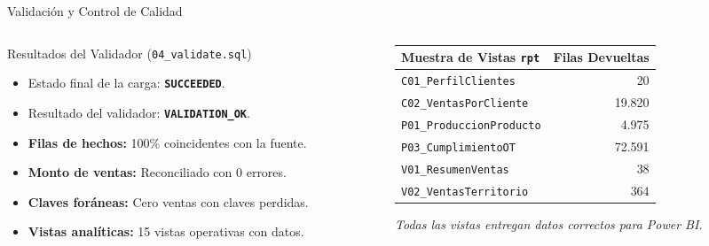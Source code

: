 \documentclass[aspectratio=169, 10pt]{beamer}
\begin{document}
\begin{frame}{Validación y Control de Calidad}
    \begin{columns}[c]
        \begin{column}{0.52\textwidth}
            \begin{block}{Resultados del Validador (\texttt{04\_validate.sql})}
                \small
                \begin{itemize}
                    \item Estado final de la carga: \textbf{\texttt{SUCCEEDED}}.
                    \item Resultado del validador: \textbf{\texttt{VALIDATION\_OK}}.
                    \item \textbf{Filas de hechos:} 100\% coincidentes con la fuente.
                    \item \textbf{Monto de ventas:} Reconciliado con 0 errores.
                    \item \textbf{Claves foráneas:} Cero ventas con claves perdidas.
                    \item \textbf{Vistas analíticas:} 15 vistas operativas con datos.
                \end{itemize}
            \end{block}
        \end{column}
        
        \begin{column}{0.45\textwidth}
            \begin{table}[H]
            \centering
            \scriptsize
            \begin{tabular}{l r}
            \toprule
            \textbf{Muestra de Vistas \texttt{rpt}} & \textbf{Filas Devueltas} \\
            \midrule
            \texttt{C01\_PerfilClientes} & 20 \\
            \texttt{C02\_VentasPorCliente} & 19.820 \\
            \texttt{P01\_ProduccionProducto} & 4.975 \\
            \texttt{P03\_CumplimientoOT} & 72.591 \\
            \texttt{V01\_ResumenVentas} & 38 \\
            \texttt{V02\_VentasTerritorio} & 364 \\
            \bottomrule
            \end{tabular}
            \end{table}
            \centering \scriptsize \textit{Todas las vistas entregan datos correctos para Power BI.}
        \end{column}
    \end{columns}
\end{frame}
\end{document}
